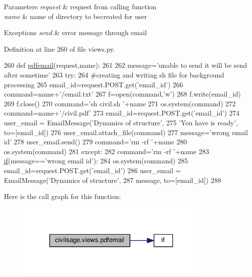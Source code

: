\begin{DoxyParams}{Parameters}
{\em request} & request from calling function \\
\hline
{\em name} & name of directory to becreated for user \\
\hline
\end{DoxyParams}

\begin{DoxyExceptions}{Exceptions}
{\em send} & error message through email \\
\hline
\end{DoxyExceptions}


Definition at line 260 of file views.\+py.


\begin{DoxyCode}
260 \textcolor{keyword}{def }\hyperlink{namespacecivilsage_1_1views_a9914ff19f8e15ccab1a07eaeac8cfb21}{pdfemail}(request,name):
261 
262     message=\textcolor{stringliteral}{'unable to send it will be send after sometime'}
263     \textcolor{keywordflow}{try}:
264         \textcolor{comment}{#creating and writing sh file for background processing}
265         email\_id=request.POST.get(\textcolor{stringliteral}{'email\_id'})
266         command=name+\textcolor{stringliteral}{'/email.txt'}
267         f=open(command,\textcolor{stringliteral}{'w'})
268         f.write(email\_id)
269         f.close()
270         command=\textcolor{stringliteral}{'sh  civil.sh '}+name
271         os.system(command)
272         command=name+\textcolor{stringliteral}{'/civil.pdf'}
273         email\_id=request.POST.get(\textcolor{stringliteral}{'email\_id'})
274         user\_email = EmailMessage(\textcolor{stringliteral}{'Dynamics of structure'},
275         \textcolor{stringliteral}{'You have is ready'}, to=[email\_id])
276         user\_email.attach\_file(command)
277         message=\textcolor{stringliteral}{'wrong email id'}
278         user\_email.send()
279         command=\textcolor{stringliteral}{'rm -rf '}+name
280         os.system(command)
281     \textcolor{keywordflow}{except}:
282         command=\textcolor{stringliteral}{'rm -rf '}+name
283         \hyperlink{bootstrap_8min_8js_ac2d69f5011896c6ed4a54e0dd36f6334}{if}(message==\textcolor{stringliteral}{'wrong email id'}):
284                     os.system(command)
285                 email\_id=request.POST.get(\textcolor{stringliteral}{'email\_id'})
286         user\_email = EmailMessage(\textcolor{stringliteral}{'Dynamics of structure'},
287         message, to=[email\_id])
288 
\end{DoxyCode}


Here is the call graph for this function\+:
\nopagebreak
\begin{figure}[H]
\begin{center}
\leavevmode
\includegraphics[width=270pt]{namespacecivilsage_1_1views_a9914ff19f8e15ccab1a07eaeac8cfb21_cgraph}
\end{center}
\end{figure}


